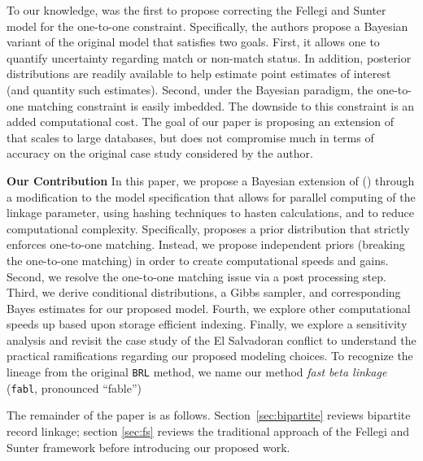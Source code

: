 \documentclass[12pt,letterpaper]{article}
\newcommand{\1}[1]{\mathbb{I}\!\left[#1\right]} %
\begin{document}
To our knowledge, \cite{sadinle_bayesian_2017} was the first to propose correcting the Fellegi and Sunter model for the one-to-one constraint. Specifically, the authors propose a Bayesian variant of the original model that satisfies two goals. First, it allows one to quantify uncertainty regarding match or non-match status. In addition, posterior distributions are readily available to help estimate point estimates of interest (and quantity such estimates). Second, under the Bayesian paradigm, the one-to-one matching constraint is easily imbedded. The downside to this constraint is an added computational cost. The goal of our paper is proposing an extension of \cite{sadinle_bayesian_2017} that scales to large databases, but does not compromise much in terms of accuracy on the original case study considered by the author. 

\textbf{Our Contribution} 
In this paper, we propose a Bayesian extension of \cite{sadinle_bayesian_2017} () through a modification to the model specification that allows for parallel computing of the linkage parameter, using hashing techniques to hasten calculations, and to reduce computational complexity.  Specifically, \cite{sadinle_bayesian_2017} proposes a prior distribution that strictly enforces one-to-one matching. Instead, we propose independent priors (breaking the one-to-one matching) in order to create computational speeds and gains. Second, we resolve the one-to-one matching issue via a post processing step. Third, we derive conditional distributions, a Gibbs sampler, and corresponding Bayes estimates for our proposed model. Fourth, we explore other computational speeds up based upon storage efficient indexing. Finally, we explore a sensitivity analysis and revisit the case study of the El Salvadoran conflict to understand the practical ramifications regarding our proposed modeling choices. 
To recognize the lineage from the original \texttt{BRL} method, we name our method \emph{fast beta linkage} (\texttt{fabl},
pronounced ``fable'')

The remainder of the paper is as follows. Section~\ref{sec:bipartite} reviews bipartite record linkage; section \ref{sec:fs} reviews the traditional approach of the Fellegi and Sunter framework before introducing our proposed work. 
\end{document}
